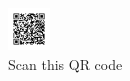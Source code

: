 \begin{figure}[h]
    \centering
    \includegraphics[width=0.1\textwidth]{images/portfolio.png}
    \caption*{Scan this QR code}
    \label{fig:figure3}
\end{figure}
